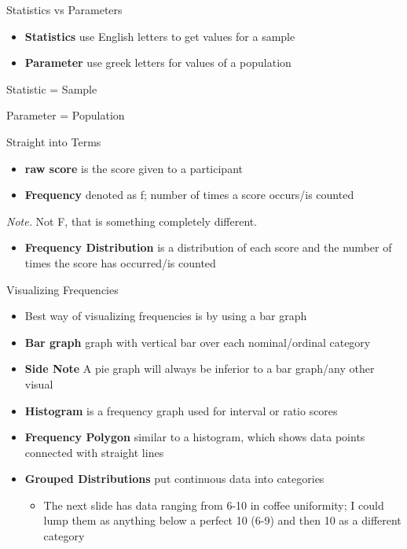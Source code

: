 \documentclass[
  ignorenonframetext,
]{beamer}
\providecommand{\tightlist}{%
  \setlength{\itemsep}{0pt}\setlength{\parskip}{0pt}}\usepackage{longtable,booktabs,array}
\begin{document}
\begin{frame}{Statistics vs Parameters}
\label{statistics-vs-parameters}
\begin{itemize}
\item
  \textbf{Statistics} use English letters to get values for a sample
\item
  \textbf{Parameter} use greek letters for values of a population
\end{itemize}

Statistic = Sample

Parameter = Population
\end{frame}

\begin{frame}{Straight into Terms}
\label{straight-into-terms}
\begin{itemize}
\item
  \textbf{raw score} is the score given to a participant
\item
  \textbf{Frequency} denoted as f; number of times a score occurs/is
  counted
\end{itemize}

\emph{Note.} Not F, that is something completely different.

\begin{itemize}
\tightlist
\item
  \textbf{Frequency Distribution} is a distribution of each score and
  the number of times the score has occurred/is counted
\end{itemize}
\end{frame}

\begin{frame}{Visualizing Frequencies}
\label{visualizing-frequencies}
\begin{itemize}
\item
  Best way of visualizing frequencies is by using a bar graph
\item
  \textbf{Bar graph} graph with vertical bar over each nominal/ordinal
  category
\item
  \textbf{Side Note} A pie graph will always be inferior to a bar
  graph/any other visual
\item
  \textbf{Histogram} is a frequency graph used for interval or ratio
  scores
\item
  \textbf{Frequency Polygon} similar to a histogram, which shows data
  points connected with straight lines
\item
  \textbf{Grouped Distributions} put continuous data into categories

  \begin{itemize}
  \tightlist
  \item
    The next slide has data ranging from 6-10 in coffee uniformity; I
    could lump them as anything below a perfect 10 (6-9) and then 10 as
    a different category
  \end{itemize}
\end{itemize}
\end{frame}
\end{document}
